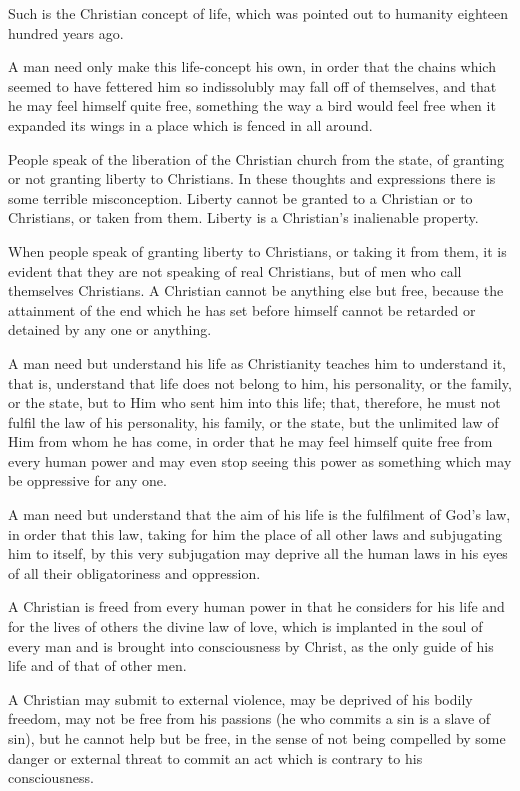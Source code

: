 \documentclass{book}
\begin{document}
Such is the Christian concept of life, which was pointed out to humanity eighteen hundred years ago.

A man need only make this life-concept his own, in order that the chains which seemed to have fettered him so indissolubly may fall off of themselves, and that he may feel himself quite free, something the way a bird would feel free when it expanded its wings in a place which is fenced in all around.

People speak of the liberation of the Christian church from the state, of granting or not granting liberty to Christians. In these thoughts and expressions there is some terrible misconception. Liberty cannot be granted to a Christian or to Christians, or taken from them. Liberty is a Christian’s inalienable property.

When people speak of granting liberty to Christians, or taking it from them, it is evident that they are not speaking of real Christians, but of men who call themselves Christians. A Christian cannot be anything else but free, because the attainment of the end which he has set before himself cannot be retarded or detained by any one or anything.

A man need but understand his life as Christianity teaches him to understand it, that is, understand that life does not belong to him, his personality, or the family, or the state, but to Him who sent him into this life; that, therefore, he must not fulfil the law of his personality, his family, or the state, but the unlimited law of Him from whom he has come, in order that he may feel himself quite free from every human power and may even stop seeing this power as something which may be oppressive for any one.

A man need but understand that the aim of his life is the fulfilment of God’s law, in order that this law, taking for him the place of all other laws and subjugating him to itself, by this very subjugation may deprive all the human laws in his eyes of all their obligatoriness and oppression.

A Christian is freed from every human power in that he considers for his life and for the lives of others the divine law of love, which is implanted in the soul of every man and is brought into consciousness by Christ, as the only guide of his life and of that of other men.

A Christian may submit to external violence, may be deprived of his bodily freedom, may not be free from his passions (he who commits a sin is a slave of sin), but he cannot help but be free, in the sense of not being compelled by some danger or external threat to commit an act which is contrary to his consciousness.
\end{document}

